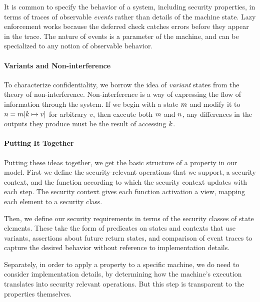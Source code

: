 It is common to specify the behavior of a system, including security properties, in
terms of traces of observable {\em events} rather than details of the machine state.
Lazy enforcement works because the deferred check catches errors before they appear
in the trace. The nature of events is a parameter of the machine, and can be specialized
to any notion of observable behavior.

\paragraph*{Variants and Non-interference}

To characterize confidentiality, we borrow the idea of \emph{variant} states
from the theory of non-interference. Non-interference is a way of expressing
the flow of information through the system. If we begin with a state \(m\)
and modify it to \(n = m[k \mapsto v]\) for arbitrary \(v\),
then execute both \(m\) and \(n\), any differences in the outputs they
produce must be the result of accessing \(k\).

\paragraph*{Putting It Together}

Putting these ideas together, we get the basic structure of a property in our model.
First we define the security-relevant operations that we support, a security context,
and the function according to which the security context updates with each step.
The security context gives each function activation a view, mapping each element to a
security class.

Then, we define our security requirements in terms of the security classes of state
elements. These take the form of predicates on states and contexts that use variants,
assertions about future return states, and comparison of event traces to capture the
desired behavior without reference to implementation details.

Separately, in order to apply a property to a specific machine, we do need to consider
implementation details, by determining how the machine's execution translates into
security relevant operations. But this step is transparent to the properties themselves.
